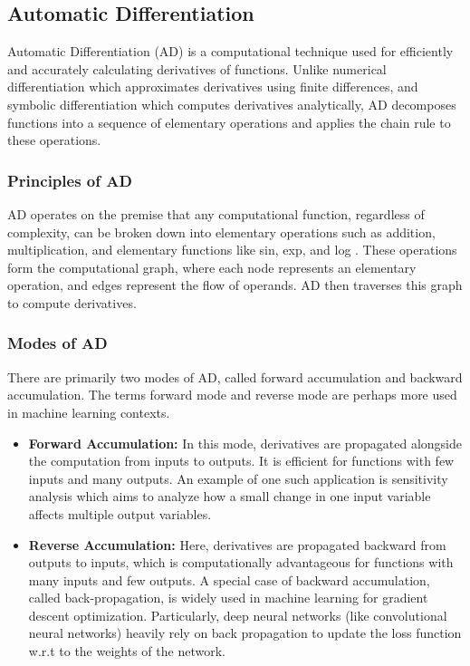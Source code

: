\documentclass[12pt, twoside,hidelinks]{article}
\theoremstyle{definition}
\numberwithin{equation}{section}
\begin{document}
\subsection{Automatic Differentiation}\label{sec:rpack:AD}

Automatic Differentiation (AD) is a computational technique used for efficiently and accurately calculating derivatives of functions. Unlike numerical differentiation which approximates derivatives using finite differences, and symbolic differentiation which computes derivatives analytically, AD decomposes functions into a sequence of elementary operations and applies the chain rule to these operations.

\subsubsection{Principles of AD}\label{sec:rpack:AD:principles}
AD operates on the premise that any computational function, regardless of complexity, can be broken down into elementary operations such as addition, multiplication, and elementary functions like sin, exp, and log \citep{WikiAutomaticDiff2024}. These operations form the computational graph, where each node represents an elementary operation, and edges represent the flow of operands. AD then traverses this graph to compute derivatives.

\subsubsection{Modes of AD}\label{sec:rpack:AD:modes}
There are primarily two modes of AD, called forward accumulation and backward accumulation. The terms forward mode and reverse mode are perhaps more used in machine learning contexts.
\begin{itemize}
    \item \textbf{Forward Accumulation:} In this mode, derivatives are propagated alongside the computation from inputs to outputs. It is efficient for functions with few inputs and many outputs. An example of one such application is sensitivity analysis which aims to analyze how a small change in one input variable affects multiple output variables.
    \item \textbf{Reverse Accumulation:} Here, derivatives are propagated backward from outputs to inputs, which is computationally advantageous for functions with many inputs and few outputs. A special case of backward accumulation, called back-propagation, is widely used in machine learning for gradient descent optimization. Particularly, deep neural networks (like convolutional neural networks) heavily rely on back propagation to update the loss function w.r.t to the weights of the network. 
\end{itemize}
\end{document}
